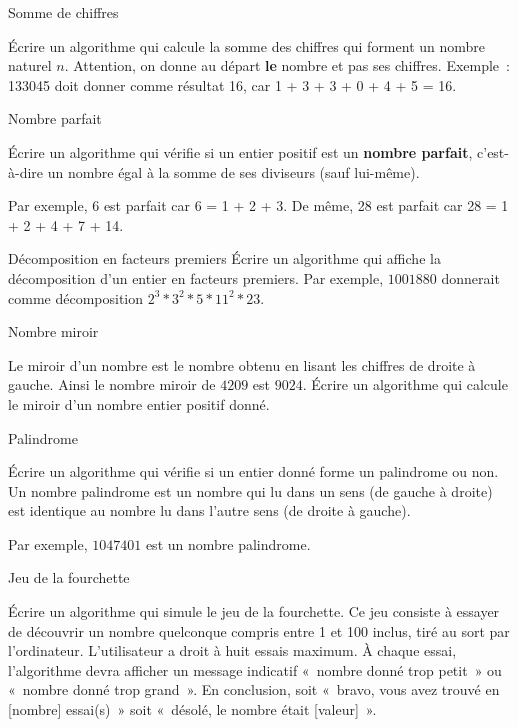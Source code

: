 	\begin{Exercice}{Somme de chiffres}

		Écrire un algorithme qui calcule la somme des chiffres qui forment un
		nombre naturel $n$. Attention, on donne au départ \textbf{le} nombre et
		pas ses chiffres. Exemple~: 133045 doit donner comme résultat 16,
		car 1 + 3 + 3 + 0 + 4 + 5 = 16.
	\end{Exercice}

	\begin{Exercice}{Nombre parfait}

		Écrire un algorithme qui vérifie si un entier positif est un
		\textbf{nombre parfait}, c’est-à-dire un nombre égal à la somme de ses
		diviseurs (sauf lui-même). 

		Par exemple, 6 est parfait car 6 = 1 + 2 + 3. 
		De même, 28 est parfait car 28 = 1 + 2 + 4 + 7 + 14.
	\end{Exercice}

	\begin{Exercice}{Décomposition en facteurs premiers}
		Écrire un algorithme qui affiche la décomposition 
		d’un entier en facteurs premiers. 
		Par exemple, $1001880$ donnerait comme décomposition
		$2^3 * 3^2 * 5 * 11^2 * 23$.
	\end{Exercice}

	\begin{Exercice}{Nombre miroir}

		Le miroir d’un nombre est le nombre obtenu
		en lisant les chiffres de droite à gauche.
		Ainsi le nombre miroir de $4209$ est $9024$.
		Écrire un algorithme qui calcule le miroir
		d’un nombre entier positif donné.
	\end{Exercice}

	\begin{Exercice}{Palindrome}

		Écrire un algorithme qui vérifie si un entier donné 
		forme un palindrome ou non. 
		Un nombre palindrome est un nombre qui lu dans un sens 
		(de gauche à droite) est identique au nombre lu dans l’autre sens 
		(de droite à gauche). 
		
		Par exemple, $1047401$ est un nombre palindrome.
	\end{Exercice}

	\begin{Exercice}{Jeu de la fourchette}

		Écrire un algorithme qui simule le jeu de la
		fourchette. Ce jeu consiste à essayer de découvrir un nombre quelconque
		compris entre 1 et 100 inclus, tiré au sort par l’ordinateur. 
		L’utilisateur a droit à huit essais
		maximum. À chaque essai, l’algorithme devra afficher un message
		indicatif «~nombre donné trop petit~» ou «~nombre donné trop grand~».
		En conclusion, soit «~bravo, vous avez trouvé en [nombre] essai(s)~» soit
		«~désolé, le nombre était [valeur]~».
	\end{Exercice}







